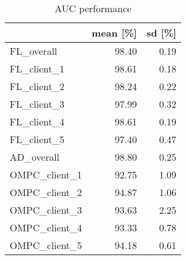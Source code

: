 \begin{table}[h]
\centering
\caption{AUC performance}
\label{tab:auc_performance}
\begin{tabular}{lrr}
\toprule
{} &  mean [\%] &  sd [\%] \\
\midrule
FL\_overall    &     98.40 &    0.19 \\
FL\_client\_1   &     98.61 &    0.18 \\
FL\_client\_2   &     98.24 &    0.22 \\
FL\_client\_3   &     97.99 &    0.32 \\
FL\_client\_4   &     98.61 &    0.19 \\
FL\_client\_5   &     97.40 &    0.47 \\
AD\_overall    &     98.80 &    0.25 \\
OMPC\_client\_1 &     92.75 &    1.09 \\
OMPC\_client\_2 &     94.87 &    1.06 \\
OMPC\_client\_3 &     93.63 &    2.25 \\
OMPC\_client\_4 &     93.33 &    0.78 \\
OMPC\_client\_5 &     94.18 &    0.61 \\
\bottomrule
\end{tabular}
\end{table}
